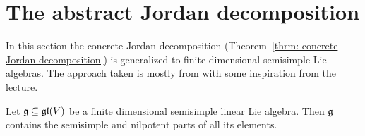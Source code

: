 \section{The abstract Jordan decomposition}
In this section the concrete Jordan decomposition (Theorem~\ref{thrm: concrete Jordan decomposition}) is generalized to finite dimensional semisimple Lie algebras. The approach taken is mostly from \cite[\S 4.2, \S 5.3, \S 5.4, \S 6.4]{Humphreys} with some inspiration from the lecture.


\begin{lem}\label{lem: semisimple linear Lie algebra containing the semisimple and nilpotent parts of its elements}
 Let $\mathfrak{g} \subseteq \mathfrak{gl}(V)$ be a finite dimensional semisimple linear Lie algebra. Then $\mathfrak{g}$ contains the semisimple and nilpotent parts of all its elements.
\end{lem}
